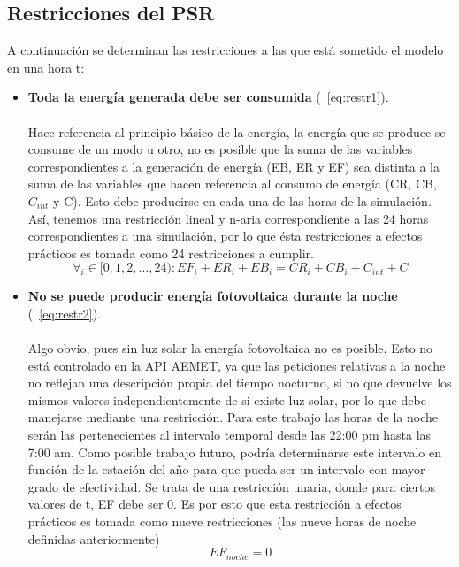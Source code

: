 \subsection{Restricciones del PSR}
A continuación se determinan las restricciones a las que está sometido el modelo en una hora t:
\begin{itemize}
\item \textbf{Toda la energía generada debe ser consumida} (~\ref{eq:restr1}).\\ \\Hace referencia al principio básico de la energía, la energía que se produce se consume de un modo u otro, no es posible que la suma de las variables correspondientes a la generación de energía (EB, ER y EF) sea distinta a la suma de las variables que hacen referencia al consumo de energía (CR, CB, $ C_{int} $ y C). Esto debe producirse en cada una de las horas de la simulación. Así, tenemos una restricción lineal y n-aria correspondiente a las 24 horas correspondientes a una simulación, por lo que ésta restricciones a efectos prácticos es tomada como 24 restricciones a cumplir.
\begin{equation}
        \label{eq:restr1}
        \forall_{i} \in [0, 1, 2, ..., 24) : EF_{i}+ER_{i}+EB_{i} = CR_{i}+CB_{i}+C_{int}+C
\end{equation}

\item \textbf{No se puede producir energía fotovoltaica durante la noche} (~\ref{eq:restr2}).\\ \\Algo obvio, pues sin luz solar la energía fotovoltaica no es posible. Esto no está controlado en la API AEMET, ya que las peticiones relativas a la noche no reflejan una descripción propia del tiempo nocturno, si no que devuelve los mismos valores independientemente de si existe luz solar, por lo que debe manejarse mediante una restricción. Para este trabajo las horas de la noche serán las pertenecientes al intervalo temporal desde las 22:00 pm hasta las 7:00 am. Como posible trabajo futuro, podría determinarse este intervalo en función de la estación del año para que pueda ser un intervalo con mayor grado de efectividad. Se trata de una restricción unaria, donde para ciertos valores de t, EF debe ser 0. Es por esto que esta restricción a efectos prácticos es tomada como nueve restricciones (las nueve horas de noche definidas anteriormente)
\begin{equation}
        \label{eq:restr2}
        EF_{noche} = 0
\end{equation}


\end{itemize}

